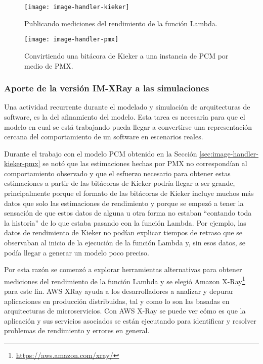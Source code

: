 \begin{figure}[h]
  \centering
  \texttt{[image: image-handler-kieker]}
  \caption{Publicando mediciones del rendimiento de la función Lambda.}
  \label{fig:image-handler-kieker}
\end{figure}

\begin{figure}[h]
  \centering
  \texttt{[image: image-handler-pmx]}
  \caption{Convirtiendo una bitácora de Kieker a una instancia de PCM por medio de PMX.}
  \label{fig:image-handler-pmx}
\end{figure}

\subsubsection{Aporte de la versión IM-XRay a las simulaciones}\label{sec:image-handler-xray}
Una actividad recurrente durante el modelado y simulación de arquitecturas de software, es la del afinamiento del modelo. Esta tarea es necesaria para que el modelo en cual se está trabajando pueda llegar a convertirse una representación cercana del comportamiento de un software en escenarios reales. 

Durante el trabajo con el modelo PCM obtenido en la Sección \ref{sec:image-handler-kieker-pmx} se notó que las estimaciones hechas por PMX no correspondían al comportamiento observado y que el esfuerzo necesario para obtener estas estimaciones a partir de las bitácoras de Kieker podría llegar a ser grande, principalmente porque el formato de las bitácoras de Kieker incluye muchos más datos que solo las estimaciones de rendimiento y porque se empezó a tener la sensación de que estos datos de alguna u otra forma no estaban ``contando toda la historia'' de lo que estaba pasando con la función Lambda. Por ejemplo, las datos de rendimiento de Kieker no podían explicar tiempos de retraso que se observaban al inicio de la ejecución de la función Lambda y, sin esos datos, se podía llegar a generar un modelo poco preciso.

Por esta razón se comenzó a explorar herramientas alternativas para obtener mediciones del rendimiento de la función Lambda y se elegió Amazon X-Ray\footnote{\url{https://aws.amazon.com/xray/}} para este fin. AWS XRay ayuda a los desarrolladores a analizar y depurar aplicaciones en producción distribuidas, tal y como lo son las basadas en arquitecturas de microservicios. Con AWS X-Ray se puede ver cómo es que la aplicación y sus servicios asociados se están ejecutando para identificar y resolver problemas de rendimiento y errores en general.

